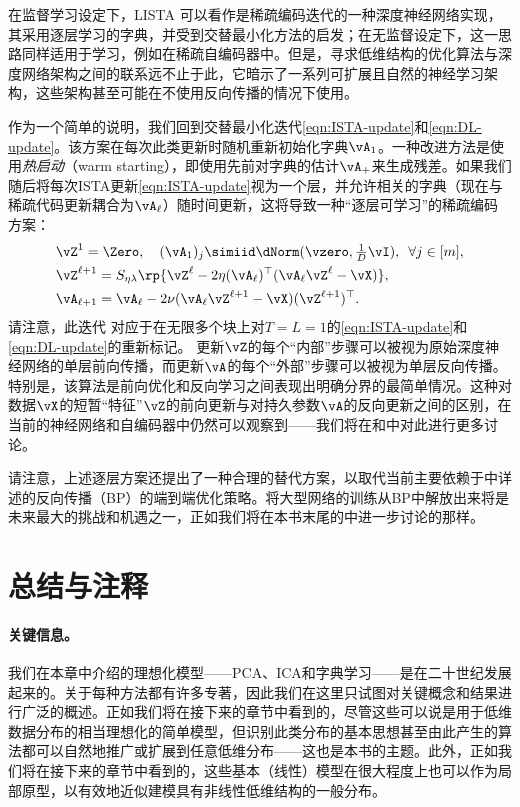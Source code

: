 \documentclass[../../book-main_zh.tex]{subfiles}
\begin{document}
在监督学习设定下，LISTA 可以看作是稀疏编码迭代的一种深度神经网络实现，其采用逐层学习的字典，并受到交替最小化方法的启发；在无监督设定下，这一思路同样适用于学习，例如在稀疏自编码器中。但是，寻求低维结构的优化算法与深度网络架构之间的联系远不止于此，它暗示了一系列可扩展且自然的神经学习架构，这些架构甚至可能在不使用反向传播的情况下使用。

作为一个简单的说明，我们回到交替最小化迭代\eqref{eqn:ISTA-update}和\eqref{eqn:DL-update}。该方案在每次此类更新时随机重新初始化字典$\vA_1$。一种改进方法是使用\textit{热启动}（warm
starting），即使用先前对字典的估计$\vA_+$来生成残差。如果我们随后将每次ISTA更新\eqref{eqn:ISTA-update}视为一个层，并允许相关的字典（现在与稀疏代码更新耦合为$\vA_\ell$）随时间更新，这将导致一种“逐层可学习”的稀疏编码方案：
\begin{align}
    & \vZ^{1}
    = \Zero, \quad (\vA_{1})_j
    \simiid \dNorm(\vzero, \tfrac{1}{D}\vI), \enspace \forall j \in [m], \\
    & \vZ^{\ell + 1} = S_{\eta\lambda}\rp{\vZ^{\ell}
        - 2\eta(\vA_{\ell})^\top(\vA_{\ell}\vZ^{\ell}
    - \vX)},\label{eq:ISTA-update-layerwise}\\
    & \vA_{\ell + 1} = \vA_{\ell}- 2\nu (\vA_{\ell}\vZ^{\ell + 1}
    - \vX)(\vZ^{\ell + 1})^\top.
\end{align}
请注意，此迭代 %
对应于在无限多个块上对$T = L = 1$的\eqref{eqn:ISTA-update}和\eqref{eqn:DL-update}的重新标记。
更新$\vZ$的每个“内部”步骤可以被视为原始深度神经网络的单层前向传播，而更新$\vA$的每个“外部”步骤可以被视为单层反向传播。特别是，该算法是前向优化和反向学习之间表现出明确分界的最简单情况。这种对数据$\vX$的短暂“特征”$\vZ$的前向更新与对持久参数$\vA$的反向更新之间的区别，在当前的神经网络和自编码器中仍然可以观察到——我们将在和中对此进行更多讨论。

请注意，上述逐层方案还提出了一种合理的替代方案，以取代当前主要依赖于中详述的反向传播（BP）的端到端优化策略。将大型网络的训练从BP中解放出来将是未来最大的挑战和机遇之一，正如我们将在本书末尾的中进一步讨论的那样。

\section{总结与注释}

\paragraph{关键信息。}
我们在本章中介绍的理想化模型——PCA、ICA和字典学习——是在二十世纪发展起来的。关于每种方法都有许多专著，因此我们在这里只试图对关键概念和结果进行广泛的概述。正如我们将在接下来的章节中看到的，尽管这些可以说是用于低维数据分布的相当理想化的简单模型，但识别此类分布的基本思想甚至由此产生的算法都可以自然地推广或扩展到任意低维分布——这也是本书的主题。此外，正如我们将在接下来的章节中看到的，这些基本（线性）模型在很大程度上也可以作为局部原型，以有效地近似建模具有非线性低维结构的一般分布。
\end{document}

